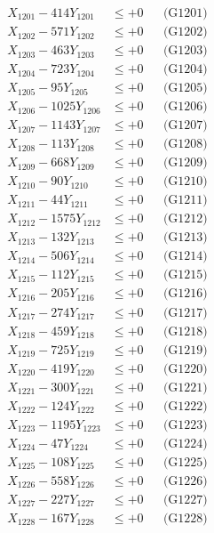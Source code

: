 \documentclass[a4paper,10pt]{article}
\begin{document}
{\begin{align}
\allowbreak
X_{1201} - 414Y_{1201} &\leq +0 && \text{(G1201)} \\
X_{1202} - 571Y_{1202} &\leq +0 && \text{(G1202)} \\
X_{1203} - 463Y_{1203} &\leq +0 && \text{(G1203)} \\
X_{1204} - 723Y_{1204} &\leq +0 && \text{(G1204)} \\
X_{1205} - 95Y_{1205} &\leq +0 && \text{(G1205)} \\
X_{1206} - 1025Y_{1206} &\leq +0 && \text{(G1206)} \\
X_{1207} - 1143Y_{1207} &\leq +0 && \text{(G1207)} \\
X_{1208} - 113Y_{1208} &\leq +0 && \text{(G1208)} \\
X_{1209} - 668Y_{1209} &\leq +0 && \text{(G1209)} \\
X_{1210} - 90Y_{1210} &\leq +0 && \text{(G1210)} \\
\allowbreak
X_{1211} - 44Y_{1211} &\leq +0 && \text{(G1211)} \\
X_{1212} - 1575Y_{1212} &\leq +0 && \text{(G1212)} \\
X_{1213} - 132Y_{1213} &\leq +0 && \text{(G1213)} \\
X_{1214} - 506Y_{1214} &\leq +0 && \text{(G1214)} \\
X_{1215} - 112Y_{1215} &\leq +0 && \text{(G1215)} \\
X_{1216} - 205Y_{1216} &\leq +0 && \text{(G1216)} \\
X_{1217} - 274Y_{1217} &\leq +0 && \text{(G1217)} \\
X_{1218} - 459Y_{1218} &\leq +0 && \text{(G1218)} \\
X_{1219} - 725Y_{1219} &\leq +0 && \text{(G1219)} \\
X_{1220} - 419Y_{1220} &\leq +0 && \text{(G1220)} \\
\allowbreak
X_{1221} - 300Y_{1221} &\leq +0 && \text{(G1221)} \\
X_{1222} - 124Y_{1222} &\leq +0 && \text{(G1222)} \\
X_{1223} - 1195Y_{1223} &\leq +0 && \text{(G1223)} \\
X_{1224} - 47Y_{1224} &\leq +0 && \text{(G1224)} \\
X_{1225} - 108Y_{1225} &\leq +0 && \text{(G1225)} \\
X_{1226} - 558Y_{1226} &\leq +0 && \text{(G1226)} \\
X_{1227} - 227Y_{1227} &\leq +0 && \text{(G1227)} \\
X_{1228} - 167Y_{1228} &\leq +0 && \text{(G1228)} \\

\end{align}}
\end{document}
